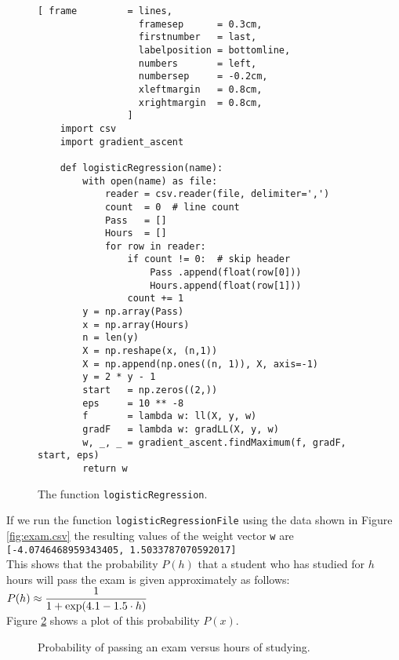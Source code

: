 \begin{figure}[!ht]
\centering
\begin{Verbatim}[ frame         = lines, 
                  framesep      = 0.3cm, 
                  firstnumber   = last,
                  labelposition = bottomline,
                  numbers       = left,
                  numbersep     = -0.2cm,
                  xleftmargin   = 0.8cm,
                  xrightmargin  = 0.8cm,
                ]
    import csv
    import gradient_ascent

    def logisticRegression(name):
        with open(name) as file:
            reader = csv.reader(file, delimiter=',')
            count  = 0  # line count
            Pass   = []
            Hours  = []
            for row in reader:
                if count != 0:  # skip header
                    Pass .append(float(row[0]))
                    Hours.append(float(row[1]))
                count += 1
        y = np.array(Pass)
        x = np.array(Hours)
        n = len(y)
        X = np.reshape(x, (n,1))
        X = np.append(np.ones((n, 1)), X, axis=-1)
        y = 2 * y - 1
        start   = np.zeros((2,))
        eps     = 10 ** -8
        f       = lambda w: ll(X, y, w)
        gradF   = lambda w: gradLL(X, y, w)
        w, _, _ = gradient_ascent.findMaximum(f, gradF, start, eps)
        return w
\end{Verbatim}
\vspace*{-0.3cm}
\caption{The function \texttt{logisticRegression}.}
\label{fig:logistic_regression.py:2}
\end{figure}

If we run the function \texttt{logisticRegressionFile} using the data shown in Figure
\ref{fig:exam.csv} the resulting values of the weight vector \texttt{w} are
\\[0.2cm]
\hspace*{1.3cm}
\texttt{[-4.0746468959343405, 1.5033787070592017]}
\\[0.2cm]
This shows that the probability $P(h)$ that a student who has studied for $h$ hours will pass the
exam is given approximately as follows:
\\[0.2cm]
\hspace*{1.3cm}
$\displaystyle P(h) \approx \frac{1}{1 + \exp(4.1 - 1.5 \cdot h)}$
\\[0.2cm]
Figure \ref{fig:exam-probability.pdf} shows a plot of this probability $P(x)$.  

\begin{figure}[!th]
\caption{Probability of passing an exam versus hours of studying.}
\label{fig:exam-probability.pdf}
\end{figure}



